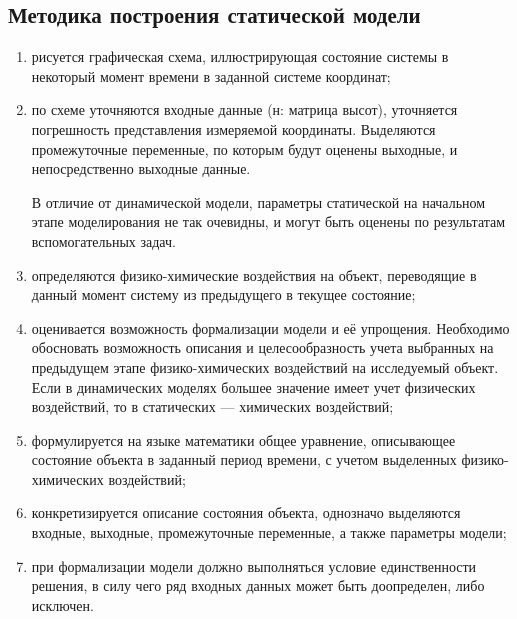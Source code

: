 \documentclass[12pt]{article}
\begin{document}
\subsection{Методика построения статической модели}
\begin{enumerate}
    \item рисуется графическая схема, иллюстрирующая состояние системы в некоторый момент времени в заданной системе координат;
    \item по схеме уточняются входные данные (н: матрица высот), уточняется погрешность представления измеряемой координаты. Выделяются промежуточные переменные, по которым будут оценены выходные, и непосредственно выходные данные.
    
    
    \begin{figure}[ht]
        \centering
        \caption{}
    \end{figure}
    
    В отличие от динамической модели, параметры статической на начальном этапе моделирования не так очевидны, и могут быть оценены по результатам вспомогательных задач.
    \item определяются физико-химические воздействия на объект, переводящие в данный момент систему из предыдущего в текущее состояние;
    \item оценивается возможность формализации модели и её упрощения. Необходимо обосновать возможность описания и целесообразность учета выбранных на предыдущем этапе физико-химических воздействий на исследуемый объект. Если в динамических моделях большее значение имеет учет физических воздействий, то в статических --- химических воздействий;
    \item формулируется на языке математики общее уравнение, описывающее состояние объекта в заданный период времени, с учетом выделенных физико-химических воздействий;
    \item конкретизируется описание состояния объекта, однозначо выделяются входные, выходные, промежуточные переменные, а также параметры модели; 
    \item при формализации модели должно выполняться условие единственности решения, в силу чего ряд входных данных может быть доопределен, либо исключен.
\end{enumerate} 
\end{document}

